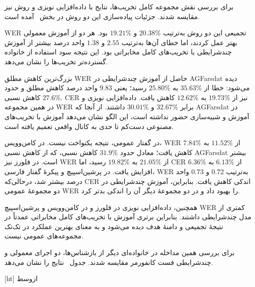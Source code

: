 برای بررسی نقش مجموعه کامل تخریب‌ها، نتایج با داده‌افزایی نویزی و روش   نیز مقایسه شدند. جزئیات پیاده‌سازی این دو روش در بخش~ آمده است.

WER تجمیعی این دو روش به‌ترتیب $20.38\%$ و $19.21\%$ بود. هر دو از آموزش معمولی بهتر عمل کردند، اما خطای آن‌ها به‌ترتیب $2.55$ و $1.38$ واحد درصد بیشتر از آموزش چندشرایطی با تخریب‌های کامل مخابراتی بود. این نتیجه سود استفاده از خانواده گسترده‌تر تخریب‌ها را نشان می‌دهد.


بزرگ‌ترین کاهش مطلق WER حاصل از آموزش چندشرایطی در AGFarsdat دیده می‌شود: خطا از $35.63\%$ به $25.80\%$ رسید؛ یعنی $9.83$ واحد درصد کاهش مطلق و حدود $27.6\%$ کاهش نسبی. CER نیز از $19.73\%$ به $12.62\%$ کاهش یافت. داده‌افزایی نویزی و  در همین مجموعه WER برابر $32.67\%$ و $30.01\%$ داشتند. از آنجا که AGFarsdat در آموزش و شبیه‌سازی حضور نداشته است، این الگو نشان می‌دهد آموزش با تخریب‌های مصنوعی دست‌کم تا حدی به کانال واقعی تعمیم یافته است.

در گفتار عمومی، نتیجه یکنواخت نیست. در کامن‌وویس، WER از $11.52\%$ به $7.84\%$ کاهش یافت؛ معادل حدود $31.9\%$ کاهش نسبی، که از کاهش نسبی AGFarsdat بیشتر است. در فلورز نیز WER از $21.05\%$ به $19.82\%$ رسید، اما CER از $6.13\%$ به $6.36\%$ افزایش یافت. در پرشین‌اسپیچ و پیکرهٔ گفتار فارسی، WER به‌ترتیب $0.72$ و $0.73$ واحد درصد بیشتر شد، درحالی‌که CER اندکی کاهش یافت. بنابراین، آموزش چندشرایطی در دو مجموعهٔ عمومی WER را بهبود داد و در دو مجموعهٔ دیگر آن را اندکی بدتر کرد.

همچنین، داده‌افزایی نویزی در فلورز و  در کامن‌وویس و پرشین‌اسپیچ WER کمتری از مدل چندشرایطی داشتند. بنابراین برتری آموزش با تخریب‌های کامل مخابراتی عمدتاً در نتیجهٔ تجمیعی و دامنهٔ هدف دیده می‌شود و به معنای بهترین عملکرد در تک‌تک مجموعه‌های عمومی نیست.


برای بررسی همین مداخله در خانواده‌ای دیگر از بازشناس‌ها، دو اجرای معمولی و چندشرایطی فست کانفورمر مقایسه شدند. جدول~ نتایج را نشان می‌دهد.

[ht]
‌ازوسط

